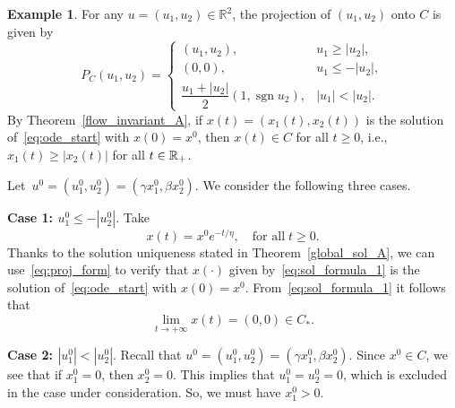 \documentclass[11pt]{article}
\theoremstyle{definition}
\newtheorem{example}{Example}
\theoremstyle{remark}
\def\R{\Bbb R}
\begin{document}
\begin{example}
{			For any $u=(u_1,u_2)\in\mathbb R^2$, the projection of $(u_1,u_2)$ onto $C$ is given by
			\begin{equation}\label{eq:proj_form}
				P_C(u_1,u_2)=
				\begin{cases}
					(u_1,u_2), & u_1\geq |u_2|,\\[1mm]
					(0,0), & u_1\leq -|u_2|,\\[1mm]
					\dfrac{u_1+|u_2|}{2}(1,\operatorname{sgn} u_2), & |u_1|<|u_2|
					.
				\end{cases}
			\end{equation}
			 By Theorem~\ref{flow_invariant_A}, if $x(t)=(x_1(t),x_2(t))$ is the solution of~\eqref{eq:ode_start} with $x(0)=x^0$, then $x(t)\in C$ for all $t\geq 0$, i.e., $x_1(t)\ge|x_2(t)|$ for all $t\in\R_+$. 
			 
			 Let~$u^0=(u_1^0, u_2^0)=(\gamma x_1^0, \beta x_2^0)$. We consider the following three cases.
			
			\medskip
			\noindent\textbf{Case 1: $u_1^0\leq -|u_2^0|$}. Take
			\begin{equation}\label{eq:sol_formula_1}
				x(t)=x^0e^{-t/\eta},\quad \text{for all} \; t\geq 0.
			\end{equation}
			Thanks to the solution uniqueness stated in Theorem~\ref{global_sol_A}, we can use~\eqref{eq:proj_form} to verify that $x(\cdot)$ given by~\eqref{eq:sol_formula_1} is the solution of~\eqref{eq:ode_start} with $x(0)=x^0$. From~\eqref{eq:sol_formula_1} it follows that
			$$
			\lim_{t\to+\infty}x(t)=(0,0)\in C_*.
			$$
				
			\medskip
	
			\noindent\textbf{Case 2: $|u_1^0|<|u_2^0|$}. Recall that $u^0=(u_1^0, u_2^0)=(\gamma x_1^0, \beta x_2^0)$. Since $x^0\in C$, we see that if $x_1^0=0$, then $x_2^0=0$. This implies that $u_1^0= u_2^0 =0$, which is excluded in the case under consideration. So, we must have $x^0_1>0$.
			
}
\end{example}
\end{document}
